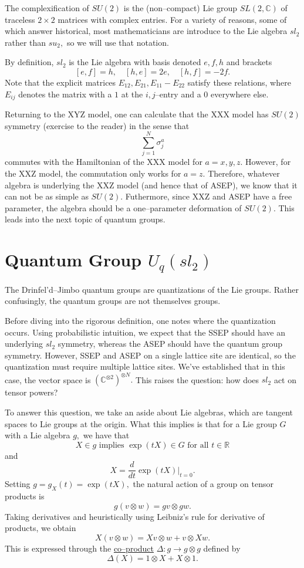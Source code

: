 \documentclass{ximera}
\begin{document}
The complexification of \(SU(2)\) is the (non--compact) Lie group \(SL(2,\mathbb{C})\) of traceless 
\(2 \times 2\) matrices with complex entries. For a variety of reasons, some of which answer historical,
most mathematicians are introduce to the Lie algebra \(sl_2\) rather than \(su_2,\) so we will use that notation.

By definition, \(sl_2\) is the Lie algebra with basis denoted \(e,f,h\) and brackets
\[
[e,f]=h, \quad [h,e]=2e, \quad [h,f]=-2f.
\]
Note that the explicit matrices \(E_{12},E_{21},E_{11}-E_{22}\) satisfy these relations, where
\(E_{ij}\) denotes the matrix with a \(1\) at the \(i,j\)--entry and a 0 everywhere else. 

Returning to the XYZ model, one can calculate that the XXX model has \(SU(2)\) symmetry (exercise to the
reader) in the sense that
\[
\sum_{j=1}^N \sigma^a_j
\]
commutes with the Hamiltonian of the XXX model for \(a=x,y,z.\) However, for the XXZ model, the
commutation only works for \(a=z.\) Therefore, whatever algebra is underlying the XXZ model (and hence
that of ASEP), we know that it can not be as simple as \(SU(2).\) Futhermore, since XXZ and ASEP have
a free parameter, the algebra should be a one--parameter deformation of \(SU(2).\) This leads into
the next topic of quantum groups. 

\section{Quantum Group \(U_q(sl_2)\)}
The Drinfel'd--Jimbo quantum groups \cite{Dri85, Jim85} are quantizations of the Lie groups. Rather confusingly, the
quantum groups are not themselves groups. 

Before diving into the rigorous definition, one notes where the quantization occurs. Using probabilistic
intuition, we expect that the SSEP should have an underlying \(sl_2\) symmetry, whereas the
ASEP should have the quantum group symmetry. However, SSEP and ASEP on a single lattice site are
identical, so the quantization must require multiple lattice sites. We've established that in this
case, the vector space is \((\mathbb{C}^{\otimes 2})^{\otimes N}.\) This raises the question:
how does \(sl_2\) act on tensor powers?

To answer this question, we take an aside about Lie algebras, which are tangent spaces to Lie groups
at the origin. What this implies is that for a Lie group \(G\) with a Lie algebra \(g,\) we have that
\[
X \in g \text{ implies } \exp(tX) \in G \text{ for all } t\in \mathbb{R}
\]
and
\[
X = \frac{d}{dt} \exp(tX) \Big|_{t=0}.
\]
Setting \(g=g_X(t)=\exp(tX),\) the natural action of a group on tensor products is
\[
g(v \otimes w)= gv \otimes gw.
\]
Taking derivatives and heuristically using Leibniz's rule for derivative of products, we obtain
\[
X(v \otimes w) = Xv \otimes w + v \otimes Xw.
\]
This is expressed through the \underline{co--product} \(\Delta: g \rightarrow g \otimes g\) defined by 
\[
\Delta(X) = 1 \otimes X + X \otimes 1.
\]
\end{document}
